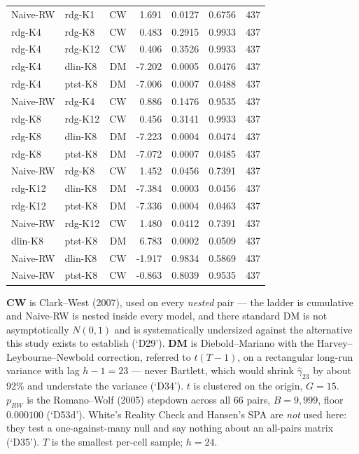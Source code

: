 \begin{table}[!t]
\begin{tabular}{llcrrrr}
Naive-RW & rdg-K1 & CW & 1.691 & 0.0127 & 0.6756 & 437 \\
rdg-K4 & rdg-K8 & CW & 0.483 & 0.2915 & 0.9933 & 437 \\
rdg-K4 & rdg-K12 & CW & 0.406 & 0.3526 & 0.9933 & 437 \\
rdg-K4 & dlin-K8 & DM & -7.202 & 0.0005 & 0.0476 & 437 \\
rdg-K4 & ptst-K8 & DM & -7.006 & 0.0007 & 0.0488 & 437 \\
Naive-RW & rdg-K4 & CW & 0.886 & 0.1476 & 0.9535 & 437 \\
rdg-K8 & rdg-K12 & CW & 0.456 & 0.3141 & 0.9933 & 437 \\
rdg-K8 & dlin-K8 & DM & -7.223 & 0.0004 & 0.0474 & 437 \\
rdg-K8 & ptst-K8 & DM & -7.072 & 0.0007 & 0.0485 & 437 \\
Naive-RW & rdg-K8 & CW & 1.452 & 0.0456 & 0.7391 & 437 \\
rdg-K12 & dlin-K8 & DM & -7.384 & 0.0003 & 0.0456 & 437 \\
rdg-K12 & ptst-K8 & DM & -7.336 & 0.0004 & 0.0463 & 437 \\
Naive-RW & rdg-K12 & CW & 1.480 & 0.0412 & 0.7391 & 437 \\
dlin-K8 & ptst-K8 & DM & 6.783 & 0.0002 & 0.0509 & 437 \\
Naive-RW & dlin-K8 & CW & -1.917 & 0.9834 & 0.5869 & 437 \\
Naive-RW & ptst-K8 & CW & -0.863 & 0.8039 & 0.9535 & 437 \\
\bottomrule
\end{tabular}
\vspace{2pt}\par\footnotesize \textbf{CW} is Clark--West (2007), used on every \emph{nested} pair --- the ladder is cumulative and Naive-RW is nested inside every model, and there standard DM is not asymptotically $N(0,1)$ and is systematically undersized against the alternative this study exists to establish (`D29'). \textbf{DM} is Diebold--Mariano with the Harvey--Leybourne--Newbold correction, referred to $t(T-1)$, on a rectangular long-run variance with lag $h-1 = 23$ --- never Bartlett, which would shrink $\hat\gamma_{23}$ by about 92\% and understate the variance (`D34'). $t$ is clustered on the origin, $G = 15$. $p_{RW}$ is the Romano--Wolf (2005) stepdown across all 66 pairs, $B = 9,999$, floor $0.000100$ (`D53d'). White's Reality Check and Hansen's SPA are \emph{not} used here: they test a one-against-many null and say nothing about an all-pairs matrix (`D35'). $T$ is the smallest per-cell sample; $h = 24$.
\end{table}
